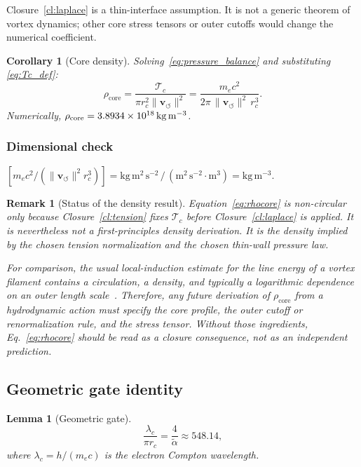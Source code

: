 \documentclass[aps,pra,preprint,longbibliography,nofootinbib]{revtex4-2}
\newtheorem{lemma}{Lemma}
\newtheorem{corollary}{Corollary}
\newtheorem{remark}{Remark}
\newcommand{\vnorm}{\lVert\mathbf{v}_{\!\boldsymbol{\circlearrowleft}}\rVert} %
\newcommand{\rhocore}{\rho_{\mathrm{core}}}      %
\newcommand{\rc}{r_c}                            %
\newcommand{\lc}{\lambda_c}                      %
\newcommand{\Tc}{\mathcal{T}_c}                  %
\begin{document}
Closure~\ref{cl:laplace} is a thin-interface assumption.  It is not a
generic theorem of vortex dynamics; other core stress tensors or outer
cutoffs would change the numerical coefficient.

\begin{corollary}[Core density]
\label{cor:rho}
Solving~\eqref{eq:pressure_balance} and substituting
\eqref{eq:Tc_def}:
\begin{equation}
  \boxed{
    \rhocore = \frac{\Tc}{\pi\rc^2\vnorm^2}
             = \frac{m_e c^2}{2\pi\,\vnorm^2\,\rc^3}.
  }
  \label{eq:rhocore}
\end{equation}
Numerically, $\rhocore = \SI{3.893\,4e18}{\kilogram\per\cubic\meter}$.
\end{corollary}

\subsubsection*{Dimensional check}
$[m_e c^2/(\vnorm^2\rc^3)]
= \mathrm{kg\,m^2\,s^{-2}\,/\,(m^2\,s^{-2}\cdot m^3)}
= \mathrm{kg\,m^{-3}}$. \checkmark

\begin{remark}[Status of the density result]
\label{rem:noncircular}
Equation~\eqref{eq:rhocore} is non-circular only because
Closure~\ref{cl:tension} fixes $\Tc$ before Closure~\ref{cl:laplace} is
applied.  It is nevertheless not a first-principles density derivation.
It is the density implied by the chosen tension normalization and the
chosen thin-wall pressure law.

For comparison, the usual local-induction estimate for the line energy
of a vortex filament contains a circulation, a density, and typically a
logarithmic dependence on an outer length scale~\cite{Saffman1992}.
Therefore, any future derivation of $\rhocore$ from a hydrodynamic action
must specify the core profile, the outer cutoff or renormalization rule,
and the stress tensor.  Without those ingredients, Eq.~\eqref{eq:rhocore}
should be read as a closure consequence, not as an independent prediction.
\end{remark}

\subsection{Geometric gate identity}
\label{sec:gate}

\begin{lemma}[Geometric gate]
\label{lem:gate}
\begin{equation}
  \frac{\lc}{\pi\rc} = \frac{4}{\tilde\alpha} \approx 548.14,
  \label{eq:gate}
\end{equation}
where $\lc = h/(m_ec)$ is the electron Compton wavelength.
\end{lemma}
\end{document}
